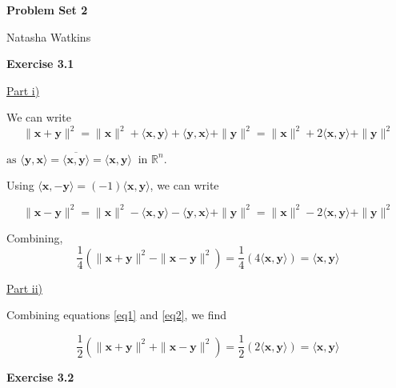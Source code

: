 \documentclass[letterpaper,12pt]{article}
\newcommand{\vect}[1]{\mathbf{#1}}
\begin{document}
\textbf{\large Problem Set 2}

Natasha Watkins

\vspace{5mm}

\textbf{Exercise 3.1}

\underline{Part i)}

We can write
\begin{equation}
  \label{eq1}
\| \vect{x} + \vect{y} \|^2 = \| \vect{x} \|^2 + \langle \vect{x}, \vect{y} \rangle +
\langle \vect{y}, \vect{x} \rangle + \| \vect{y} \|^2
= \| \vect{x} \|^2 + 2 \langle \vect{x}, \vect{y} \rangle + \| \vect{y} \|^2 
\end{equation}

\begin{math}
\text{as } \langle \vect{y}, \vect{x} \rangle 
= \overline{\langle \vect{x}, \vect{y} \rangle}
= \langle \vect{x}, \vect{y} \rangle \ \text{ in } \mathbb R^n.
\end{math}

Using $\langle \vect{x}, \vect{-y} \rangle = (-1)\langle \vect{x}, \vect{y} \rangle$, we can write

\begin{equation}
  \label{eq2}
\| \vect{x} - \vect{y} \|^2 = \| \vect{x} \|^2 - \langle \vect{x}, \vect{y} \rangle -
\langle \vect{y}, \vect{x} \rangle + \| \vect{y} \|^2
= \| \vect{x} \|^2 - 2 \langle \vect{x}, \vect{y} \rangle + \| \vect{y} \|^2 
\end{equation}

Combining,
\begin{equation*}
  \frac{1}{4} (\| \vect{x} + \vect{y} \|^2 - \| \vect{x} - \vect{y} \|^2)
  = \frac{1}{4}(4 \langle \vect{x}, \vect{y} \rangle) = \langle \vect{x}, \vect{y} \rangle
\end{equation*}

\underline{Part ii)}

Combining equations \ref{eq1} and \ref{eq2}, we find

\begin{equation*}
  \frac{1}{2} (\| \vect{x} + \vect{y} \|^2 + \| \vect{x} - \vect{y} \|^2)
  = \frac{1}{2}(2 \langle \vect{x}, \vect{y} \rangle) = \langle \vect{x}, \vect{y} \rangle
\end{equation*}

\textbf{Exercise 3.2}
\end{document}
